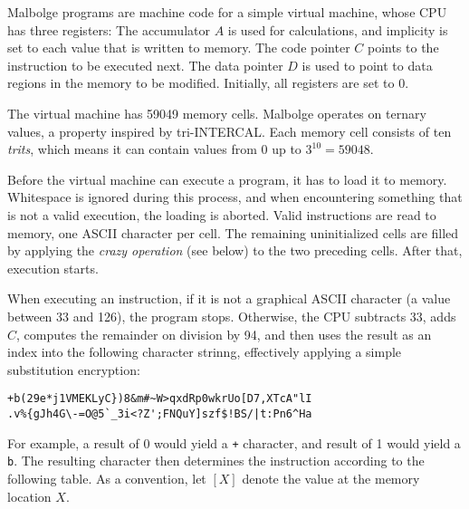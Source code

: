 Malbolge programs are machine code for a simple virtual machine, whose CPU has three registers: The accumulator $A$ is used for calculations, and implicity is set to each value that is written to memory. The code pointer $C$ points to the instruction to be executed next. The data pointer $D$ is used to point to data regions in the memory to be modified. Initially, all registers are set to 0.

The virtual machine has 59049 memory cells. Malbolge operates on ternary values, a property inspired by tri-INTERCAL. Each memory cell consists of ten \emph{trits}, which means it can contain values from $0$ up to $3^{10} = 59048$.

Before the virtual machine can execute a program, it has to load it to memory. Whitespace is ignored during this process, and when encountering something that is not a valid execution, the loading is aborted. Valid instructions are read to memory, one ASCII character per cell. The remaining uninitialized cells are filled by applying the \emph{crazy operation} (see below) to the two preceding cells. After that, execution starts.

When executing an instruction, if it is not a graphical ASCII character (a value between 33 and 126), the program stops. Otherwise, the CPU subtracts 33, adds $C$, computes the remainder on division by 94, and then uses the result as an index into the following character strinng, effectively applying a simple substitution encryption:

\begin{lstlisting}[numbers=none,frame=none]
+b(29e*j1VMEKLyC})8&m#~W>qxdRp0wkrUo[D7,XTcA"lI
.v%{gJh4G\-=O@5`_3i<?Z';FNQuY]szf$!BS/|t:Pn6^Ha
\end{lstlisting}

For example, a result of 0 would yield a \texttt{+} character, and result of 1 would yield a \texttt{b}. The resulting character then determines the instruction according to the following table. As a convention, let $[X]$ denote the value at the memory location $X$.


